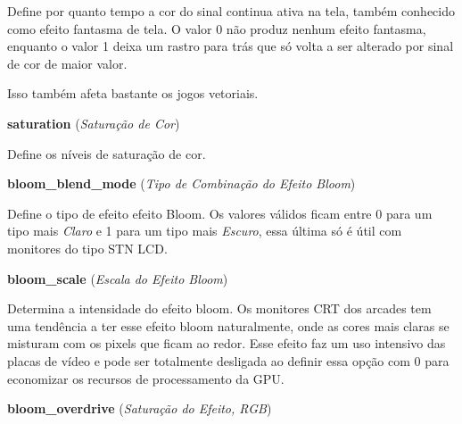 \documentclass[letterpaper,10pt,brazil]{sphinxmanual}
\begin{document}
\begin{DUlineblock}{0em}
\begin{DUlineblock}{\DUlineblockindent}
\item[] Define por quanto tempo a cor do sinal continua ativa na tela, também conhecido como efeito fantasma de tela. O valor 0 não produz nenhum efeito fantasma, enquanto o valor 1 deixa um rastro para trás que só volta a ser alterado por sinal de cor de maior valor.
\item[] 
\item[] Isso também afeta bastante os jogos vetoriais.
\item[] 
\end{DUlineblock}
\item[] \textbf{saturation} (\emph{Saturação de Cor})
\item[] 
\item[]
\begin{DUlineblock}{\DUlineblockindent}
\item[] Define os níveis de saturação de cor.
\item[] 
\end{DUlineblock}
\item[] \textbf{bloom\_blend\_mode} (\emph{Tipo de Combinação do Efeito Bloom})
\item[] 
\item[]
\begin{DUlineblock}{\DUlineblockindent}
\item[] Define o tipo de efeito efeito Bloom. Os valores válidos ficam entre 0 para um tipo mais \emph{Claro} e 1 para um tipo mais \emph{Escuro}, essa última só é útil com monitores do tipo STN LCD.
\item[] 
\end{DUlineblock}
\item[] \textbf{bloom\_scale} (\emph{Escala do Efeito Bloom})
\item[] 
\item[]
\begin{DUlineblock}{\DUlineblockindent}
\item[] Determina a intensidade do efeito bloom. Os monitores CRT dos arcades tem uma tendência a ter esse efeito bloom naturalmente, onde as cores mais claras se misturam com os pixels que ficam ao redor. Esse efeito faz um uso intensivo das placas de vídeo e pode ser totalmente desligada ao definir essa opção com 0 para economizar os recursos de processamento da GPU.
\item[] 
\end{DUlineblock}
\item[] \textbf{bloom\_overdrive} (\emph{Saturação do Efeito, RGB})
\item[] 

\end{DUlineblock}
\end{document}
